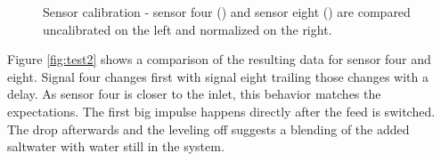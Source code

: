 \begin{figure}[H]
	\begin{center}
		\caption{Sensor calibration - sensor four (\drawline[blue]) and sensor eight (\drawline[red]) are compared uncalibrated on the left and normalized on the right.}
		\label{fig:test2_37_adj}
	\end{center}
\end{figure}

Figure \ref{fig:test2} shows a comparison of the resulting data for sensor four and eight. Signal four changes first with signal eight trailing those changes with a delay. As sensor four is closer to the inlet, this behavior matches the expectations. The first big impulse happens directly after the feed is switched. The drop afterwards and the leveling off suggests a blending of the added saltwater with water still in the system.

